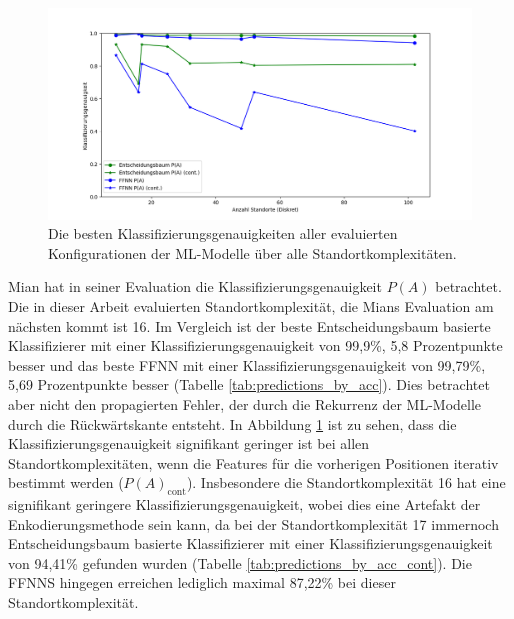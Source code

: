 \begin{figure}[h!]
    \centering
    \includegraphics[width=\linewidth]{images/best_dt_vs_knn_acc_vs_acc_cont.png}
    \caption{Die besten Klassifizierungsgenauigkeiten aller evaluierten Konfigurationen der ML-Modelle über alle Standortkomplexitäten.}
    \label{fig:best_dt_acc_vs_knn_acc_vs_cont}
\end{figure}
\newline
\newline
Mian hat in seiner Evaluation die Klassifizierungsgenauigkeit $P(A)$ betrachtet.
Die in dieser Arbeit evaluierten Standortkomplexität, die Mians Evaluation am nächsten kommt ist 16.
Im Vergleich ist der beste Entscheidungsbaum basierte Klassifizierer mit einer Klassifizierungsgenauigkeit von 99,9\%, 5,8 Prozentpunkte besser
und das beste FFNN mit einer Klassifizierungsgenauigkeit von 99,79\%, 5,69 Prozentpunkte besser (Tabelle \ref{tab:predictions_by_acc}).
\newline
\newline
Dies betrachtet aber nicht den propagierten Fehler, der durch die Rekurrenz der ML-Modelle durch die Rückwärtskante entsteht.
In Abbildung \ref{fig:best_dt_acc_vs_knn_acc_vs_cont} ist zu sehen, dass die Klassifizierungsgenauigkeit signifikant geringer ist bei allen Standortkomplexitäten,
wenn die Features für die vorherigen Positionen iterativ bestimmt werden ($P(A)_{\text{cont}}$).
Insbesondere die Standortkomplexität 16 hat eine signifikant geringere Klassifizierungsgenauigkeit, wobei dies eine Artefakt der Enkodierungsmethode sein kann,
da bei der Standortkomplexität 17 immernoch Entscheidungsbaum basierte Klassifizierer mit einer Klassifizierungsgenauigkeit von 94,41\% gefunden wurden (Tabelle \ref{tab:predictions_by_acc_cont}).
Die FFNNS hingegen erreichen lediglich maximal 87,22\% bei dieser Standortkomplexität.
\newline
\newline
